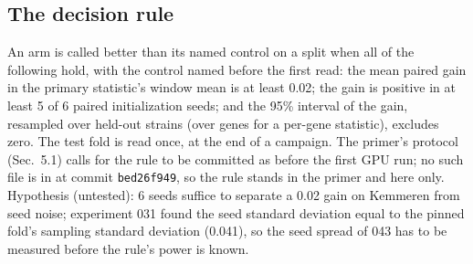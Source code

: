 \subsection{The decision rule}
\label{sec:rule}

An arm is called better than its named control on a split when all of the following hold,
with the control named before the first read: the mean paired gain in the primary
statistic's window mean is at least 0.02; the gain is positive in at least 5 of 6 paired
initialization seeds; and the 95\% interval of the gain, resampled over held-out strains
(over genes for a per-gene statistic), excludes zero. The test fold is read once, at the end of a campaign. The primer's
protocol (Sec.\ 5.1) calls for the rule to be committed as 
before the first GPU run; no such file is in  at commit \texttt{bed26f949}, so
the rule stands in the primer and here only. Hypothesis (untested): 6 seeds suffice to
separate a 0.02 gain on Kemmeren from seed noise; experiment 031 found the seed standard
deviation equal to the pinned fold's sampling standard deviation (0.041), so the seed
spread of 043 has to be measured before the rule's power is known.
